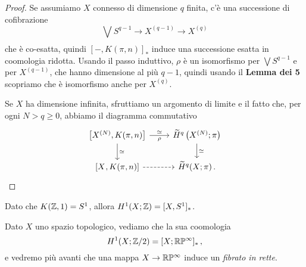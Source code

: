 \begin{thm}
\begin{proof}
		Se assumiamo $X$ connesso di dimensione $q$ finita, c'è una successione di cofibrazione
		\begin{equation*}
			\bigvee_{} S^{q-1} \longrightarrow X^{(q-1)} \longrightarrow X^{(q)}
		\end{equation*}
		che è co-esatta, quindi $[-,K(\pi,n)]_{\ast}$ induce una successione esatta in 
		coomologia ridotta. Usando il passo induttivo,
		$\rho$ è un isomorfismo per $\bigvee S^{q-1}$ e per $X^{(q-1)}$,
		che hanno dimensione al più $q-1$, quindi usando
		il \textbf{Lemma dei 5} scopriamo che è isomorfismo anche per $X^{(q)}$.
		
		Se $X$ ha dimensione infinita, sfruttiamo un argomento di limite
		e il fatto che, per ogni $N > q \ge 0$, abbiamo il diagramma commutativo
		\begin{equation*}
			\begin{tikzcd}
				{\left[ X^{(N)}, K(\pi,n) \right] } \ar[r, "\simeq", "\rho"'] \ar[d, "\simeq"]
				& {\widetilde{H}^{q}\left(X^{(N)};\pi\right)} \ar[d, "\simeq"] \\
				{\left[ X^{}, K(\pi,n) \right] } \ar[r, dashed]
				& \widetilde{H}^{q}(X;\pi)\,.
			\end{tikzcd}
		\end{equation*}
		\end{proof}
	\end{thm}
	
	\begin{ex}
		Dato che $K({\mathbb Z},1) = S^{1}$, allora $H^{1}(X;{\mathbb Z}) = [X,S^{1}]_{\ast}$.
	\end{ex}
	
	\begin{ex}
		Dato $X$ uno spazio topologico, vediamo che la sua coomologia
		\begin{equation*}
			H^{1}(X;{\mathbb Z}/2) = [X;{\mathbb R}\mathbb{P}^{\infty}]_{\ast}\,,
		\end{equation*}
		e vedremo più avanti che una mappa $X \to {\mathbb R}\mathbb{P}^{\infty}$
		induce un \emph{fibrato in rette}.
	\end{ex}






